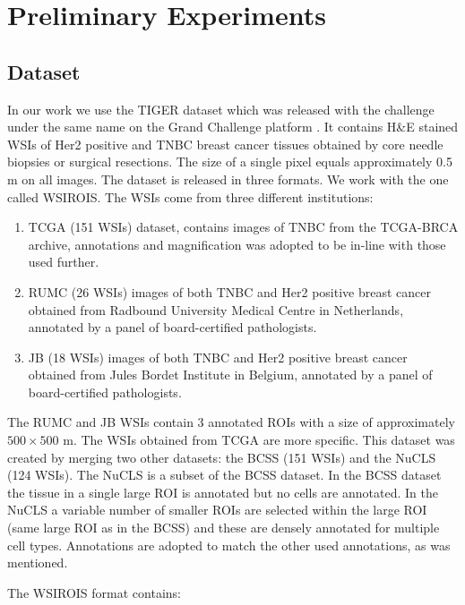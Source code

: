 \chapter{Preliminary Experiments}

\section{Dataset}
In our work we use the TIGER dataset which was released with the challenge under the same name on the Grand Challenge platform \cite{tiger_dataset}. It contains H\&E stained WSIs of Her2 positive and TNBC breast cancer tissues obtained by core needle biopsies or surgical resections. The size of a single pixel equals approximately 0.5 \textmu m on all images. The dataset is released in three formats. We work with the one called WSIROIS. The WSIs come from three different institutions:

\begin{enumerate}
    \item TCGA (151 WSIs) dataset, contains images of TNBC from the TCGA-BRCA archive, annotations and magnification was adopted to be in-line with those used further.
    \item RUMC (26 WSIs) images of both TNBC and Her2 positive breast cancer obtained from Radbound University Medical Centre in Netherlands, annotated by a panel of board-certified pathologists.
    \item JB (18 WSIs) images of both TNBC and Her2 positive breast cancer obtained from Jules Bordet Institute in Belgium, annotated by a panel of board-certified pathologists.
\end{enumerate}

The RUMC and JB WSIs contain 3 annotated ROIs with a size of approximately $500\!\times\!500$ \textmu m. The WSIs obtained from TCGA are more specific. This dataset was created by merging two other datasets: the BCSS (151 WSIs) and the NuCLS (124 WSIs). The NuCLS is a subset of the BCSS dataset. In the BCSS dataset the tissue in a single large ROI is annotated but no cells are annotated. In the NuCLS a variable number of smaller ROIs are selected within the large ROI (same large ROI as in the BCSS) and these are densely annotated for multiple cell types. Annotations are adopted to match the other used annotations, as was mentioned.

The WSIROIS format contains:


